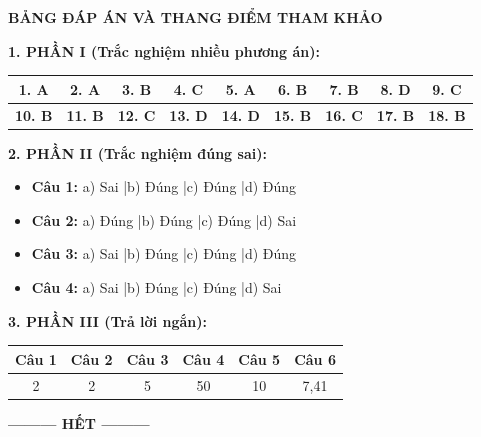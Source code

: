 \documentclass[12pt,a4paper]{article}
\begin{document}
\newpage
\noindent
\textbf{\large BẢNG ĐÁP ÁN VÀ THANG ĐIỂM THAM KHẢO}
\smallskip

\noindent
\textbf{1. PHẦN I (Trắc nghiệm nhiều phương án):}
\begin{center}
\begin{tabular}{|c|c|c|c|c|c|c|c|c|}
\hline
\textbf{1. A} & \textbf{2. A} & \textbf{3. B} & \textbf{4. C} & \textbf{5. A} & \textbf{6. B} & \textbf{7. B} & \textbf{8. D} & \textbf{9. C} \\ \hline
\textbf{10. B} & \textbf{11. B} & \textbf{12. C} & \textbf{13. D} & \textbf{14. D} & \textbf{15. B} & \textbf{16. C} & \textbf{17. B} & \textbf{18. B} \\ \hline
\end{tabular}
\end{center}

\noindent
\textbf{2. PHẦN II (Trắc nghiệm đúng sai):}
\begin{itemize}
	\item \textbf{Câu 1:} a) Sai \quad|\quad b) Đúng \quad|\quad c) Đúng \quad|\quad d) Đúng
	\item \textbf{Câu 2:} a) Đúng \quad|\quad b) Đúng \quad|\quad c) Đúng \quad|\quad d) Sai
	\item \textbf{Câu 3:} a) Sai \quad|\quad b) Đúng \quad|\quad c) Đúng \quad|\quad d) Đúng
	\item \textbf{Câu 4:} a) Sai \quad|\quad b) Đúng \quad|\quad c) Đúng \quad|\quad d) Sai
\end{itemize}

\noindent
\textbf{3. PHẦN III (Trả lời ngắn):}
\begin{center}
\begin{tabular}{|c|c|c|c|c|c|}
\hline
\textbf{Câu 1} & \textbf{Câu 2} & \textbf{Câu 3} & \textbf{Câu 4} & \textbf{Câu 5} & \textbf{Câu 6} \\ \hline
2 & 2 & 5 & 50 & 10 & 7,41 \\ \hline
\end{tabular}
\end{center}

\begin{center}
\textbf{--------- HẾT ---------}
\end{center}
\end{document}
